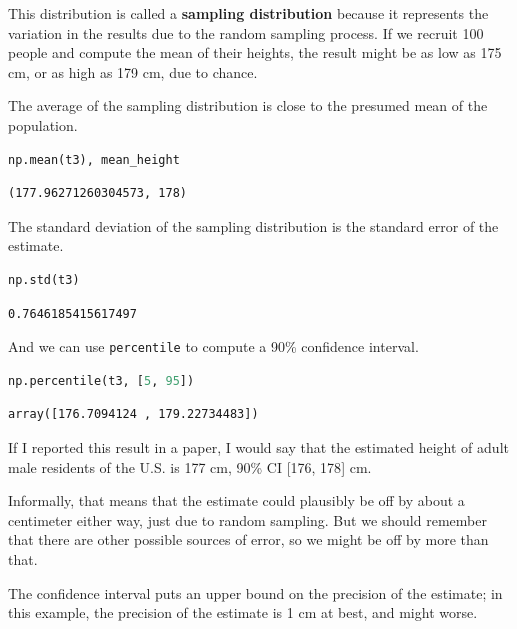 This distribution is called a \textbf{sampling distribution} because it
represents the variation in the results due to the random sampling
process. If we recruit 100 people and compute the mean of their heights,
the result might be as low as 175 cm, or as high as 179 cm, due to
chance.

The average of the sampling distribution is close to the presumed mean
of the population.

\begin{lstlisting}[language=Python,style=source]
np.mean(t3), mean_height
\end{lstlisting}

\begin{lstlisting}[style=output]
(177.96271260304573, 178)
\end{lstlisting}

The standard deviation of the sampling distribution is the standard
error of the estimate.

\begin{lstlisting}[language=Python,style=source]
np.std(t3)
\end{lstlisting}

\begin{lstlisting}[style=output]
0.7646185415617497
\end{lstlisting}

And we can use \passthrough{\lstinline!percentile!} to compute a 90\%
confidence interval.

\begin{lstlisting}[language=Python,style=source]
np.percentile(t3, [5, 95])
\end{lstlisting}

\begin{lstlisting}[style=output]
array([176.7094124 , 179.22734483])
\end{lstlisting}

If I reported this result in a paper, I would say that the estimated
height of adult male residents of the U.S. is 177 cm, 90\% CI {[}176,
178{]} cm.

Informally, that means that the estimate could plausibly be off by about
a centimeter either way, just due to random sampling. But we should
remember that there are other possible sources of error, so we might be
off by more than that.

The confidence interval puts an upper bound on the precision of the
estimate; in this example, the precision of the estimate is 1 cm at
best, and might worse.

